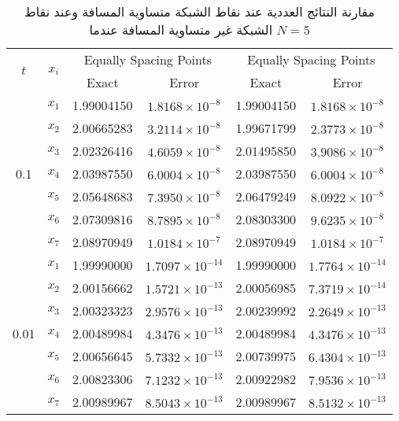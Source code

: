 	\begin{table}[ht]
		\renewcommand{\arraystretch}{1.5}
		\centering
		\begin{english}
\begin{tabular}{|c|c|c|c|c|c|}
			\hline
			\multirow{2}{*}{\( t \)} & \multirow{2}{*}{\( x_i \)} & \multicolumn{2}{c|}{Equally Spacing Points} & \multicolumn{2}{c|}{Equally Spacing Points} \\
			\cline{3-6}
			& & Exact & Error & Exact & Error \\
			\hline
			\multirow{7}{*}{0.1} & \( x_1 \) & 1.99004150 & \( 1.8168 \times 10^{-8} \) & 1.99004150 & \( 1.8168 \times 10^{-8} \) \\
			& \( x_2 \) & 2.00665283 & \( 3.2114 \times 10^{-8} \) & 1.99671799 & \( 2.3773 \times 10^{-8} \) \\
			& \( x_3 \) & 2.02326416 & \( 4.6059 \times 10^{-8} \) & 2.01495850 & \( 3.9086 \times 10^{-8} \) \\
			& \( x_4 \) & 2.03987550 & \( 6.0004 \times 10^{-8} \) & 2.03987550 & \( 6.0004 \times 10^{-8} \) \\
			& \( x_5 \) & 2.05648683 & \( 7.3950 \times 10^{-8} \) & 2.06479249 & \( 8.0922 \times 10^{-8} \) \\
			& \( x_6 \) & 2.07309816 & \( 8.7895 \times 10^{-8} \) & 2.08303300 & \( 9.6235 \times 10^{-8} \) \\
			& \( x_7 \) & 2.08970949 & \( 1.0184 \times 10^{-7} \) & 2.08970949 & \( 1.0184 \times 10^{-7} \) \\
			\hline
			\multirow{7}{*}{0.01} & \( x_1 \) & 1.99990000 & \( 1.7097 \times 10^{-14} \) & 1.99990000 & \( 1.7764 \times 10^{-14} \) \\
			& \( x_2 \) & 2.00156662 & \( 1.5721 \times 10^{-13} \) & 2.00056985 & \( 7.3719 \times 10^{-14} \) \\
			& \( x_3 \) & 2.00323323 & \( 2.9576 \times 10^{-13} \) & 2.00239992 & \( 2.2649 \times 10^{-13} \) \\
			& \( x_4 \) & 2.00489984 & \( 4.3476 \times 10^{-13} \) & 2.00489984 & \( 4.3476 \times 10^{-13} \) \\
			& \( x_5 \) & 2.00656645 & \( 5.7332 \times 10^{-13} \) & 2.00739975 & \( 6.4304 \times 10^{-13} \) \\
			& \( x_6 \) & 2.00823306 & \( 7.1232 \times 10^{-13} \) & 2.00922982 & \( 7.9536 \times 10^{-13} \) \\
			& \( x_7 \) & 2.00989967 & \( 8.5043 \times 10^{-13} \) & 2.00989967 & \( 8.5132 \times 10^{-13} \) \\
			\hline
		\end{tabular}
\end{english}
	\caption{\centering مقارنة النتائج العددية عند نقاط الشبكة متساوية المسافة وعند نقاط الشبكة غير متساوية المسافة عندما $N=5$}
\label{tab:secondN7}
\end{table}
	
